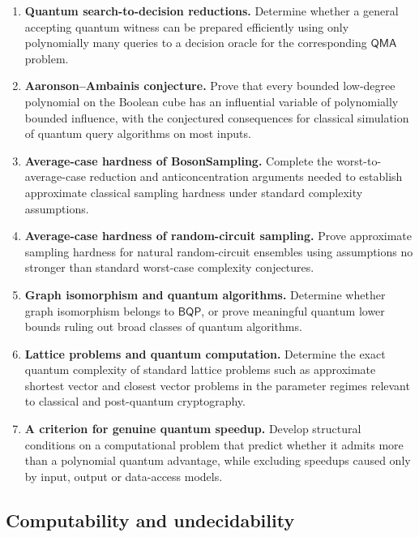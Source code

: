 \documentclass{article}
\begin{document}
\begin{enumerate}[label=\textbf{A\arabic*.},leftmargin=*]
\item \precise{} \textbf{Quantum search-to-decision reductions.}
Determine whether a general accepting quantum witness can be prepared
efficiently using only polynomially many queries to a decision oracle
for the corresponding \(\mathsf{QMA}\) problem.

\item \precise{} \textbf{Aaronson--Ambainis conjecture.}
Prove that every bounded low-degree polynomial on the Boolean cube has
an influential variable of polynomially bounded influence, with the
conjectured consequences for classical simulation of quantum query
algorithms on most inputs.

\item \precise{} \textbf{Average-case hardness of BosonSampling.}
Complete the worst-to-average-case reduction and anticoncentration
arguments needed to establish approximate classical sampling hardness
under standard complexity assumptions.

\item \precise{} \textbf{Average-case hardness of random-circuit sampling.}
Prove approximate sampling hardness for natural random-circuit
ensembles using assumptions no stronger than standard worst-case
complexity conjectures.

\item \precise{} \textbf{Graph isomorphism and quantum algorithms.}
Determine whether graph isomorphism belongs to \(\mathsf{BQP}\), or
prove meaningful quantum lower bounds ruling out broad classes of
quantum algorithms.

\item \precise{} \textbf{Lattice problems and quantum computation.}
Determine the exact quantum complexity of standard lattice problems
such as approximate shortest vector and closest vector problems in the
parameter regimes relevant to classical and post-quantum cryptography.

\item \formalism{} \textbf{A criterion for genuine quantum speedup.}
Develop structural conditions on a computational problem that predict
whether it admits more than a polynomial quantum advantage, while
excluding speedups caused only by input, output or data-access models.

\end{enumerate}


\subsection{Computability and undecidability}
\end{document}
